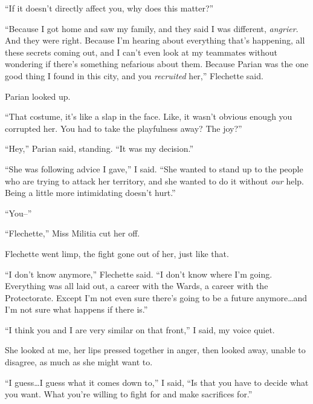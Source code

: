 ``If it doesn't directly affect you, why does this matter?''



``Because I got home and saw my family, and they said I was different, \emph{angrier}.  And they were right.  Because I'm hearing about everything that's happening, all these secrets coming out, and I can't even look at my teammates without wondering if there's something nefarious about them.  Because Parian was the one good thing I found in this city, and you \emph{recruited} her,'' Flechette said.



Parian looked up.



``That costume, it's like a slap in the face.  Like, it wasn't obvious enough you corrupted her.  You had to take the playfulness away?  The joy?''



``Hey,'' Parian said, standing.  ``It was my decision.''



``She was following advice I gave,'' I said.  ``She wanted to stand up to the people who are trying to attack her territory, and she wanted to do it without \emph{our} help.  Being a little more intimidating doesn't hurt.''



``You--''



``Flechette,'' Miss Militia cut her off.



Flechette went limp, the fight gone out of her, just like that.



``I don't know anymore,'' Flechette said.  ``I don't know where I'm going.  Everything was all laid out, a career with the Wards, a career with the Protectorate.  Except I'm not even sure there's going to be a future anymore\ldots and I'm not sure what happens if there is.''



``I think you and I are very similar on that front,'' I said, my voice quiet.



She looked at me, her lips pressed together in anger, then looked away, unable to disagree, as much as she might want to.



``I guess\ldots I guess what it comes down to,'' I said, ``Is that you have to decide what you want.  What you're willing to fight for and make sacrifices for.''



